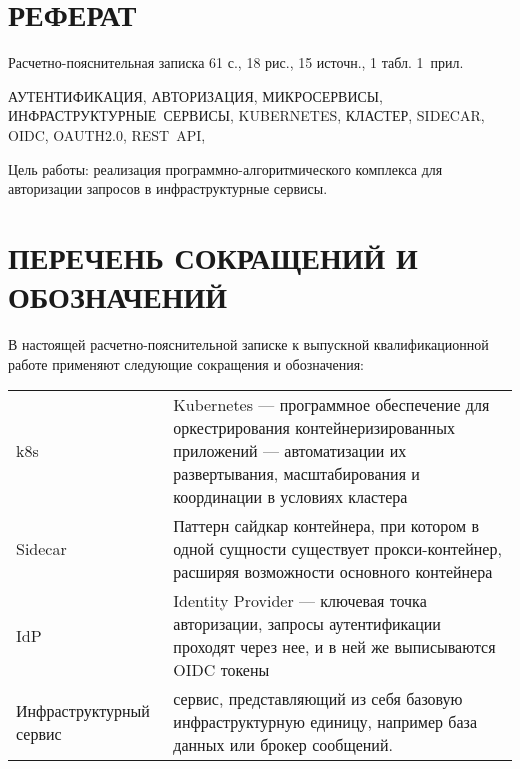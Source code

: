 {\centering \chapter*{РЕФЕРАТ}}

Расчетно-пояснительная записка 61 с., 18 рис., 15 источн., 1 табл. \mbox{1 прил.}

\noindent \mbox{АУТЕНТИФИКАЦИЯ}, \mbox{АВТОРИЗАЦИЯ}, \mbox{МИКРОСЕРВИСЫ}, \mbox{ИНФРАСТРУКТУРНЫЕ СЕРВИСЫ}, \mbox{KUBERNETES}, \mbox{КЛАСТЕР},  \mbox{SIDECAR}, \mbox{OIDC}, \mbox{OAUTH2.0}, \mbox{REST API},

Цель работы: реализация программно-алгоритмического комплекса для авторизации запросов в инфраструктурные сервисы.

{\centering \maketableofcontents}

{\centering \chapter*{ПЕРЕЧЕНЬ СОКРАЩЕНИЙ И ОБОЗНАЧЕНИЙ}}

В настоящей расчетно-пояснительной записке к выпускной квалификационной работе применяют следующие сокращения и обозначения:

\begin{table}[H]
\begin{tabular}{p{5cm}p{10.5cm}}
k8s & Kubernetes --- программное обеспечение для оркестрирования контейнеризированных приложений --- автоматизации их развертывания, масштабирования и координации в условиях кластера
\tabularnewline
Sidecar & Паттерн сайдкар контейнера, при котором в одной сущности существует прокси-контейнер, расширяя возможности основного контейнера
\tabularnewline
IdP & Identity Provider --- ключевая точка авторизации, запросы аутентификации проходят через нее, и в ней же выписываются OIDC токены
\tabularnewline
Инфраструктурный сервис & сервис, представляющий из себя базовую инфраструктурную единицу, например база данных или брокер сообщений.
\tabularnewline
\end{tabular}
\end{table}